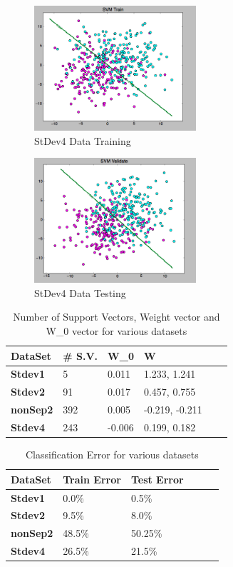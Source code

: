 \documentclass[pageno]{jpaper}
\begin{document}
\begin{figure}[ht!]
\centering
\includegraphics[width=60mm]{stdev4_train}
\caption{StDev4 Data Training}
\label{overflow}
\end{figure}

\begin{figure}[ht!]
\centering
\includegraphics[width=60mm]{stdev4_test}
\caption{StDev4 Data Testing}
\label{overflow}
\end{figure}



\begin{table}[h!]
  \centering
  \begin{tabular}{llllll|}
    \hline
     \textbf{DataSet} &\textbf{\# S.V.}  & \textbf{W\_0}  & \textbf{W} \\
    \hline
    \hline
 \textbf{Stdev1} 	&5 &0.011 &1.233, 1.241  \\
 \hline
\textbf{Stdev2}	&91 	& 0.017 & 0.457, 0.755  \\
 \hline
\textbf{nonSep2}	&392 &0.005	 &-0.219, -0.211  \\
 \hline
\textbf{Stdev4}	&243 	&-0.006 &0.199, 0.182 \\
 \hline
 \end{tabular}
  \caption{Number of Support Vectors, Weight vector and W\_0 vector for various datasets}
  \label{table:formatting}
\end{table}

\begin{table}[h!]
  \centering
  \begin{tabular}{llllll|}
    \hline
     \textbf{DataSet}  & \textbf{Train Error} & \textbf{Test Error}\\
    \hline
    \hline
 \textbf{Stdev1} 	   &0.0\% & 0.5\%\\
 \hline
\textbf{Stdev2}	 & 9.5\% &8.0\% \\
 \hline
\textbf{nonSep2}	 &48.5\% &50.25\% \\
 \hline
\textbf{Stdev4}	 &26.5\% & 21.5\%\\
 \hline
 
  \end{tabular}
  \caption{Classification Error for various datasets}
  \label{table:formatting}
\end{table}
\end{document}
